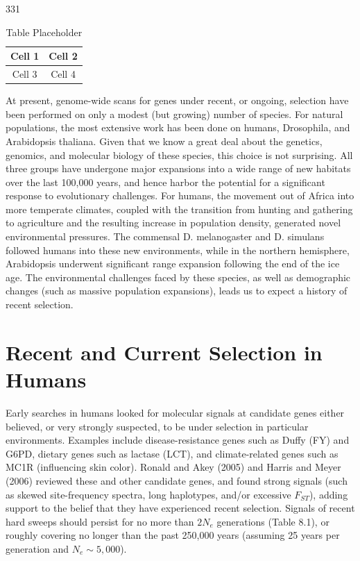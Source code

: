 \documentclass{article}
\begin{document}
331

\begin{table}[h]
\centering
\begin{tabular}{|c|c|}
\hline
Cell 1 & Cell 2 \\
\hline
Cell 3 & Cell 4 \\
\hline
\end{tabular}
\caption{Table Placeholder}
\end{table}

At present, genome-wide scans for genes under recent, or ongoing, selection have been performed on only a modest (but growing) number of species. For natural populations, the most extensive work has been done on humans, Drosophila, and Arabidopsis thaliana. Given that we know a great deal about the genetics, genomics, and molecular biology of these species, this choice is not surprising. All three groups have undergone major expansions into a wide range of new habitats over the last 100,000 years, and hence harbor the potential for a significant response to evolutionary challenges. For humans, the movement out of Africa into more temperate climates, coupled with the transition from hunting and gathering to agriculture and the resulting increase in population density, generated novel environmental pressures. The commensal D. melanogaster and D. simulans followed humans into these new environments, while in the northern hemisphere, Arabidopsis underwent significant range expansion following the end of the ice age. The environmental challenges faced by these species, as well as demographic changes (such as massive population expansions), leads us to expect a history of recent selection.

\section{Recent and Current Selection in Humans}
Early searches in humans looked for molecular signals at candidate genes either believed, or very strongly suspected, to be under selection in particular environments. Examples include disease-resistance genes such as Duffy (FY) and G6PD, dietary genes such as lactase (LCT), and climate-related genes such as MC1R (influencing skin color). Ronald and Akey (2005) and Harris and Meyer (2006) reviewed these and other candidate genes, and found strong signals (such as skewed site-frequency spectra, long haplotypes, and/or excessive  $ F_{ST} $), adding support to the belief that they have experienced recent selection. Signals of recent hard sweeps should persist for no more than  $ 2N_{e} $ generations (Table 8.1), or roughly covering no longer than the past 250,000 years (assuming 25 years per generation and  $ N_{e} \sim 5,000 $).
\end{document}
